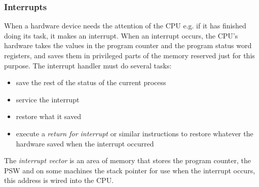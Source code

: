\documentclass[twoside]{article}
\begin{document}
\subsubsection{Interrupts}
When a hardware device needs the attention of the CPU e.g. if it has finished doing its task, it makes an interrupt. When an interrupt occurs, the CPU's hardware takes the values in the program counter and the program status word registers, and saves them in privileged parts of the memory reserved just for this purpose. The interrupt handler must do several tasks: 
\begin{itemize}
\item save the rest of the status of the current process
\item service the interrupt
\item restore what it saved
\item execute a \emph{return for interrupt} or similar instructions to restore whatever the hardware saved when the interrupt occurred
\end{itemize}
The \emph{interrupt vector} is an area of memory that stores the program counter, the PSW and on some machines the stack pointer for use when the interrupt occurs, this address is wired into the CPU.
\end{document}
